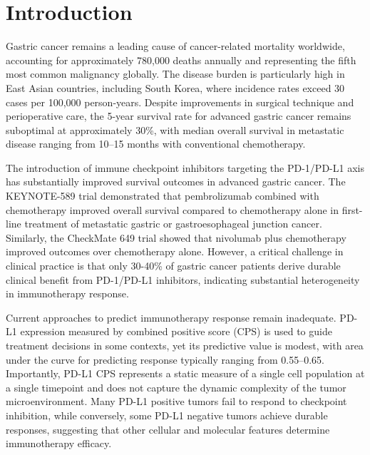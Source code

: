 \documentclass[12pt,twoside]{article}
\begin{document}
\section{Introduction}

Gastric cancer remains a leading cause of cancer-related mortality worldwide, accounting for approximately 780,000 deaths annually and representing the fifth most common malignancy globally. The disease burden is particularly high in East Asian countries, including South Korea, where incidence rates exceed 30 cases per 100,000 person-years. Despite improvements in surgical technique and perioperative care, the 5-year survival rate for advanced gastric cancer remains suboptimal at approximately 30\%, with median overall survival in metastatic disease ranging from 10--15 months with conventional chemotherapy.

The introduction of immune checkpoint inhibitors targeting the PD-1/PD-L1 axis has substantially improved survival outcomes in advanced gastric cancer. The KEYNOTE-589 trial demonstrated that pembrolizumab combined with chemotherapy improved overall survival compared to chemotherapy alone in first-line treatment of metastatic gastric or gastroesophageal junction cancer. Similarly, the CheckMate 649 trial showed that nivolumab plus chemotherapy improved outcomes over chemotherapy alone. However, a critical challenge in clinical practice is that only 30-40\% of gastric cancer patients derive durable clinical benefit from PD-1/PD-L1 inhibitors, indicating substantial heterogeneity in immunotherapy response.

Current approaches to predict immunotherapy response remain inadequate. PD-L1 expression measured by combined positive score (CPS) is used to guide treatment decisions in some contexts, yet its predictive value is modest, with area under the curve for predicting response typically ranging from 0.55--0.65. Importantly, PD-L1 CPS represents a static measure of a single cell population at a single timepoint and does not capture the dynamic complexity of the tumor microenvironment. Many PD-L1 positive tumors fail to respond to checkpoint inhibition, while conversely, some PD-L1 negative tumors achieve durable responses, suggesting that other cellular and molecular features determine immunotherapy efficacy.
\end{document}

